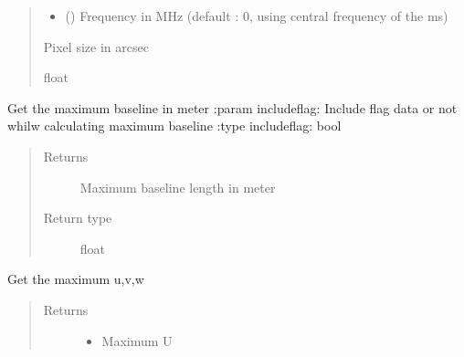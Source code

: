 \documentclass[letterpaper,10pt,english]{sphinxmanual}
\begin{document}
\begin{fulllineitems}
\begin{fulllineitems}
\begin{quote}
\begin{description}
\begin{itemize}
\item {} 
\sphinxAtStartPar
{} () \textendash{} Frequency in MHz (default : 0, using central frequency of the ms)

\end{itemize}

\item[{Returns}] \leavevmode
\sphinxAtStartPar
Pixel size in arcsec

\item[{Return type}] \leavevmode
\sphinxAtStartPar
float

\end{description}\end{quote}

\end{fulllineitems}


\begin{fulllineitems}
\label{\detokenize{paircars:paircars.basic_func.ImageBasic.calc_max_baseline}}
\sphinxAtStartPar
Get the maximum baseline in meter
:param includeflag: Include flag data or not whilw calculating maximum baseline
:type includeflag: bool
\begin{quote}\begin{description}
\item[{Returns}] \leavevmode
\sphinxAtStartPar
Maximum baseline length in meter

\item[{Return type}] \leavevmode
\sphinxAtStartPar
float

\end{description}\end{quote}

\end{fulllineitems}


\begin{fulllineitems}
\label{\detokenize{paircars:paircars.basic_func.ImageBasic.calc_max_uvw}}
\sphinxAtStartPar
Get the maximum u,v,w
\begin{quote}\begin{description}
\item[{Returns}] \leavevmode
\sphinxAtStartPar
\begin{itemize}
\item {} 
\sphinxAtStartPar
{} \textendash{} Maximum U


\end{itemize}
\end{description}
\end{quote}
\end{fulllineitems}
\end{fulllineitems}
\end{document}
